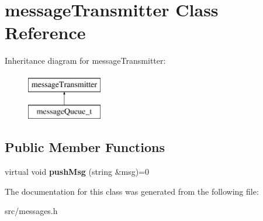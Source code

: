 \hypertarget{classmessageTransmitter}{\section{message\-Transmitter \-Class \-Reference}
\label{classmessageTransmitter}
}
\-Inheritance diagram for message\-Transmitter\-:\begin{figure}[H]
\begin{center}
\leavevmode
\includegraphics[height=2.000000cm]{classmessageTransmitter}
\end{center}
\end{figure}
\subsection*{\-Public \-Member \-Functions}
\begin{DoxyCompactItemize}
\item 
\hypertarget{classmessageTransmitter_a6ea6597f5ae37d4bc9b2f26f9840e624}{virtual void {\bfseries push\-Msg} (string \&msg)=0}\label{classmessageTransmitter_a6ea6597f5ae37d4bc9b2f26f9840e624}

\end{DoxyCompactItemize}


\-The documentation for this class was generated from the following file\-:\begin{DoxyCompactItemize}
\item 
src/messages.\-h\end{DoxyCompactItemize}

